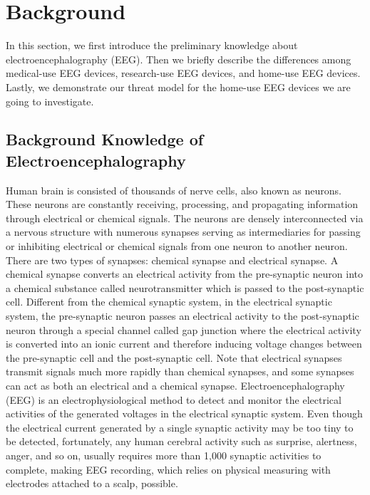 \section{Background}
\label{sec:background}

In this section, we first introduce the preliminary knowledge about electroencephalography (EEG). Then we briefly describe the differences among medical-use EEG devices, research-use EEG devices, and home-use EEG devices. Lastly, we demonstrate our threat model for the home-use EEG devices we are going to investigate. 

\subsection{Background Knowledge of Electroencephalography}
Human brain is consisted of thousands of nerve cells, also known as neurons. These neurons are constantly receiving, processing, and propagating information through electrical or chemical signals. The neurons are densely interconnected via a nervous structure with numerous synapses serving as intermediaries for passing or inhibiting electrical or chemical signals from one neuron to another neuron. There are two types of synapses: chemical synapse and electrical synapse. A chemical synapse converts an electrical activity from the pre-synaptic neuron into a chemical substance called neurotransmitter which is passed to the post-synaptic cell. Different from the chemical synaptic system, in the electrical synaptic system, the pre-synaptic neuron passes an electrical activity to the post-synaptic neuron through a special channel called gap junction where the electrical activity is converted into an ionic current and therefore inducing voltage changes between the pre-synaptic cell and the post-synaptic cell. Note that electrical synapses transmit signals much more rapidly than chemical synapses, and some synapses can act as both an electrical and a chemical synapse. Electroencephalography (EEG) is an electrophysiological method to detect and monitor the electrical activities of the generated voltages in the electrical synaptic system. Even though the electrical current generated by a single synaptic activity may be too tiny to be detected, fortunately, any human cerebral activity such as surprise, alertness, anger, and so on, usually requires more than 1,000 synaptic activities to complete, making EEG recording, which relies on physical measuring with electrodes attached to a scalp, possible. \\
